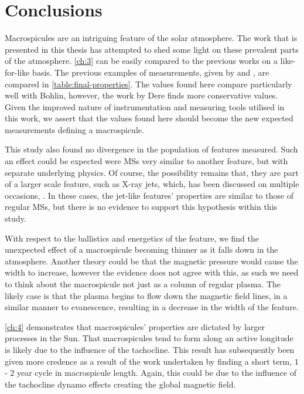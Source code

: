 
\label{ch:conc}
\chapter{Conclusions}

Macrospicules are an intriguing feature of the solar atmosphere.
The work that is presented in this thesis has attempted to shed some light on these prevalent parts of the atmosphere.
\cref{ch:3} can be easily compared to the previous works on a like-for-like basis.
The previous examples of measurements, given by \cite{Bohlin1975} and \cite{Dere89}, are compared in \cref{table:final-properties}.
The values found here compare particularly well with Bohlin, however, the work by Dere finds more conservative values.
Given the improved nature of instrumentation and measuring tools utilised in this work, we assert that the values found here should become the new expected measurements defining a macrospicule.

This study also found no divergence in the population of features measured.
Such an effect could be expected were MSs very similar to another feature, but with separate underlying physics.
Of course, the possibility remains that, they are part of a larger scale feature, such as X-ray jets, which, has been discussed on multiple occasions, \cite{Parenti2002, Kamio2010}.
In these cases, the jet-like features' properties are similar to those of regular MSs, but there is no evidence to support this hypothesis within this study.   

With respect to the ballistics and energetics of the feature, we find the unexpected effect of a macrospicule becoming thinner as it falls down in the atmosphere.
Another theory could be that the magnetic pressure would cause the width to increase, however the evidence does not agree with this, as such we need to think about the macrospicule not just as a column of regular plasma.
The likely case is that the plasma begins to flow down the magnetic field lines, in a similar manner to evanescence, resulting in a decrease in the width of the feature.

\cref{ch:4} demonstrates that macrospicules' properties are dictated by larger processes in the Sun.
That macrospicules tend to form along an active longitude is likely due to the influence of the tachocline.
This result has subsequently been given more credence as a result of the work undertaken by \cite{Kiss2017} finding a short term, $1$ - $2$ year cycle in macrospicule length.
Again, this could be due to the influence of the tachocline dynamo effects creating the global magnetic field.

